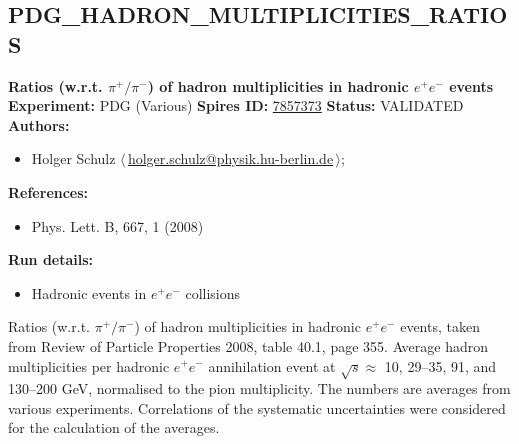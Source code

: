 \subsection[PDG\_HADRON\_MULTIPLICITIES\_RATIOS]{PDG\_HADRON\_MULTIPLICITIES\_RATIOS\,\cite{Amsler:2008zzb}}
\textbf{Ratios (w.r.t. $\pi^+/\pi^-$) of hadron multiplicities in hadronic $e^+e^-$ events}\newline
\textbf{Experiment:} PDG (Various) \newline
\textbf{Spires ID:} \href{http://www.slac.stanford.edu/spires/find/hep/www?rawcmd=key+7857373}{7857373}\newline
\textbf{Status:} VALIDATED\newline
\textbf{Authors:}
\begin{itemize}
  \item Holger Schulz $\langle\,$\href{mailto:holger.schulz@physik.hu-berlin.de}{holger.schulz@physik.hu-berlin.de}$\,\rangle$;
\end{itemize}
\textbf{References:}
\begin{itemize}
  \item Phys. Lett. B, 667, 1 (2008)
\end{itemize}
\textbf{Run details:}
\begin{itemize}

  \item Hadronic events in $e^+ e^-$ collisions\end{itemize}

\noindent Ratios (w.r.t. $\pi^+/\pi^-$) of hadron multiplicities in hadronic $e^+ e^-$ events, taken from Review of Particle Properties 2008, table 40.1, page 355.  Average hadron multiplicities per hadronic $e^+ e^-$ annihilation event at $\sqrt{s} \approx$ 10, 29--35, 91, and 130--200 GeV, normalised to the pion multiplicity. The numbers are averages from various experiments. Correlations of the systematic uncertainties were considered for the calculation of the averages.

\clearpage


